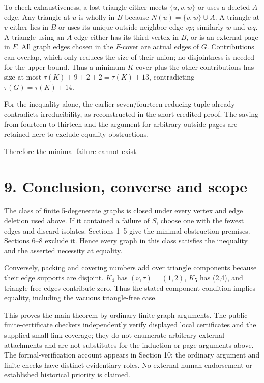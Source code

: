 \documentclass[11pt]{article}
\begin{document}
To check exhaustiveness, a lost triangle either meets \(\{u,v,w\}\) or
uses a deleted \(A\)-edge. Any triangle at \(u\) is wholly in \(B\)
because \(N(u)=\{v,w\}\cup A\). A triangle at \(v\) either lies in \(B\)
or uses its unique outside-neighbor edge \(vp\); similarly \(w\) and
\(wq\). A triangle using an \(A\)-edge either has its third vertex in
\(B\), or is an external page in \(F\). All graph edges chosen in the
\(F\)-cover are actual edges of \(G\). Contributions can overlap, which
only reduces the size of their union; no disjointness is needed for the
upper bound. Thus a minimum \(K\)-cover plus the other contributions has
size at most \(\tau(K)+9+2+2=\tau(K)+13\), contradicting
\(\tau(G)=\tau(K)+14\).

For the inequality alone, the earlier seven/fourteen reducing tuple
already contradicts irreducibility, as reconstructed in the short
credited proof. The saving from fourteen to thirteen and the argument
for arbitrary outside pages are retained here to exclude equality
obstructions.

Therefore the minimal failure cannot exist.

\section{9. Conclusion, converse and
scope}\label{conclusion-converse-and-scope}

The class of finite 5-degenerate graphs is closed under every vertex and
edge deletion used above. If it contained a failure of \(S\), choose one
with the fewest edges and discard isolates. Sections 1--5 give the
minimal-obstruction premises. Sections 6--8 exclude it. Hence every
graph in this class satisfies the inequality and the asserted necessity
at equality.

Conversely, packing and covering numbers add over triangle components
because their edge supports are disjoint. \(K_4\) has
\((\nu,\tau)=(1,2)\), \(K_5\) has (2,4), and triangle-free edges
contribute zero. Thus the stated component condition implies equality,
including the vacuous triangle-free case.

This proves the main theorem by ordinary finite graph arguments. The
public finite-certificate checkers independently verify displayed local
certificates and the supplied small-link coverage; they do not enumerate
arbitrary external attachments and are not substitutes for the induction
or page arguments above. The formal-verification account appears in
Section 10; the ordinary argument and finite checks have distinct
evidentiary roles. No external human endorsement or established
historical priority is claimed.
\end{document}
